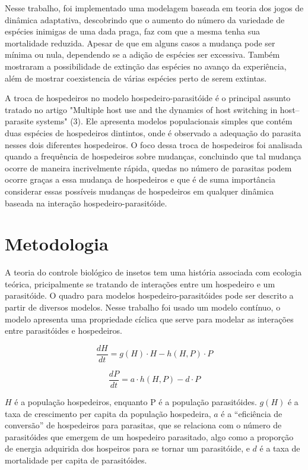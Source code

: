 Nesse trabalho, foi implementado uma modelagem baseada em teoria dos jogos de dinâmica adaptativa, descobrindo que o aumento do número da variedade de espécies inimigas de uma dada praga, faz com que a mesma tenha sua mortalidade reduzida. Apesar de que em alguns casos a mudança pode ser mínima ou nula, dependendo se a adição de espécies ser excessiva. Também mostraram a possibilidade de extinção das espécies no avanço da experiência, além de mostrar coexistencia de várias espécies perto de serem extintas. 

\medskip

A troca de hospedeiros no modelo hospedeiro-parasitóide é o principal assunto tratado no artigo "Multiple host use and the dynamics of host switching in host–parasite systems" (3). Ele apresenta  modelos populacionais simples que contém duas espécies de hospedeiros dintintos, onde é observado a adequação do parasita nesses dois diferentes hospedeiros. O foco dessa troca de hospedeiros foi analisada quando a frequência de hospedeiros sobre mudanças, concluindo que tal mudança ocorre de maneira incrivelmente rápida, quedas no número de parasitas podem ocorre graças a essa mudança de hospedeiros e que é de suma importância considerar essas possíveis mudanças de hospedeiros em qualquer dinâmica baseada na interação hospedeiro-parasitóide.

\section{Metodologia}

A teoria do controle biológico de insetos tem uma história associada
com ecologia teórica, pricipalmente se tratando de interações entre um hospedeiro e um parasitóide. O quadro para modelos hospedeiro-parasitóides pode ser descrito a partir de diversos modelos. Nesse trabalho foi usado um modelo contínuo, o modelo apresenta uma propriedade cíclica que serve para modelar as interações entre parasitóides e hospedeiros.

\[ \frac{dH}{dt} = g(H) \cdot H - h(H,P)  \cdot P \]

\[ \frac{dP}{dt} = a \cdot h(H,P) - d \cdot P  \]

$H$ é a população hospedeiros, enquanto P é a população parasitóides. $g( H)$ é a taxa de crescimento per capita da população hospedeira, $a$ é a ``eficiência de conversão” de hospedeiros para parasitas, que se relaciona com o número de parasitóides que emergem de um hospedeiro parasitado, algo como a proporção de energia adquirida dos hospeiros para se tornar um parasitóide, e $d$ é a taxa de mortalidade per capita de parasitóides.

